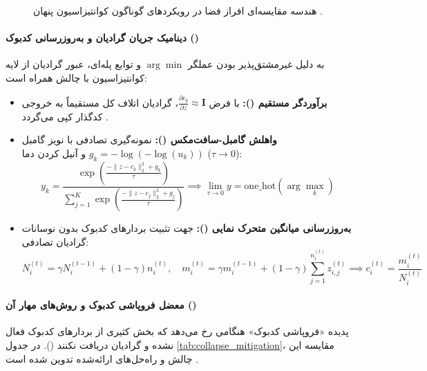 \begin{figure}[htbp]
{\begin{tikzpicture}[
    font=\small,
    scale=0.95,
    panel/.style={draw=blue!60!black, fill=white, rounded corners=8pt, line width=1pt, drop shadow}
]
\end{tikzpicture}%
}
\caption{هندسه مقایسه‌ای افراز فضا در رویکردهای گوناگون کوانتیزاسیون پنهان \cite{li2025discrete}.}
\label{fig:quant_geometry}
\end{figure}

\paragraph*{دینامیک جریان گرادیان و به‌روزرسانی کدبوک ()}
به دلیل غیرمشتق‌پذیر بودن عملگر $\arg\min$ و توابع پله‌ای، عبور گرادیان از لایه کوانتیزاسیون با چالش همراه است:
\begin{itemize}
    \item \textbf{برآوردگر مستقیم ():} با فرض $\frac{\partial c_q}{\partial z} \approx \mathbf{I}$، گرادیان اتلاف کل مستقیماً به خروجی کدگذار کپی می‌گردد \cite{bengio2013estimating}.
    \item \textbf{واهلش گامبل-سافت‌مکس ():} نمونه‌گیری تصادفی با نویز گامبل $g_k = -\log(-\log(u_k))$ و آنیل کردن دما ($\tau \to 0$):
    \begin{equation}
        y_k = \frac{\exp\left(\frac{-\|z - c_k\|_2^2 + g_k}{\tau}\right)}{\sum_{j=1}^K \exp\left(\frac{-\|z - c_j\|_2^2 + g_j}{\tau}\right)} \implies \lim_{\tau \to 0} y = \text{one\_hot}(\arg\max_k)
    \end{equation}
    \item \textbf{به‌روزرسانی میانگین متحرک نمایی ():} جهت تثبیت بردارهای کدبوک بدون نوسانات گرادیان تصادفی:
    \begin{equation}
        N_i^{(t)} = \gamma N_i^{(t-1)} + (1 - \gamma) n_i^{(t)}, \quad m_i^{(t)} = \gamma m_i^{(t-1)} + (1 - \gamma) \sum_{j=1}^{n_i^{(t)}} z_{i,j}^{(t)} \implies c_i^{(t)} = \frac{m_i^{(t)}}{N_i^{(t)}}
    \end{equation}
\end{itemize}

\paragraph*{معضل فروپاشی کدبوک و روش‌های مهار آن ()}
پدیده «فروپاشی کدبوک» هنگامی رخ می‌دهد که بخش کثیری از بردارهای کدبوک فعال نشده و گرادیان دریافت نکنند (). در جدول \ref{tab:collapse_mitigation}، مقایسه این چالش و راه‌حل‌های ارائه‌شده تدوین شده است \cite{li2025discrete, jia2025principles}.

